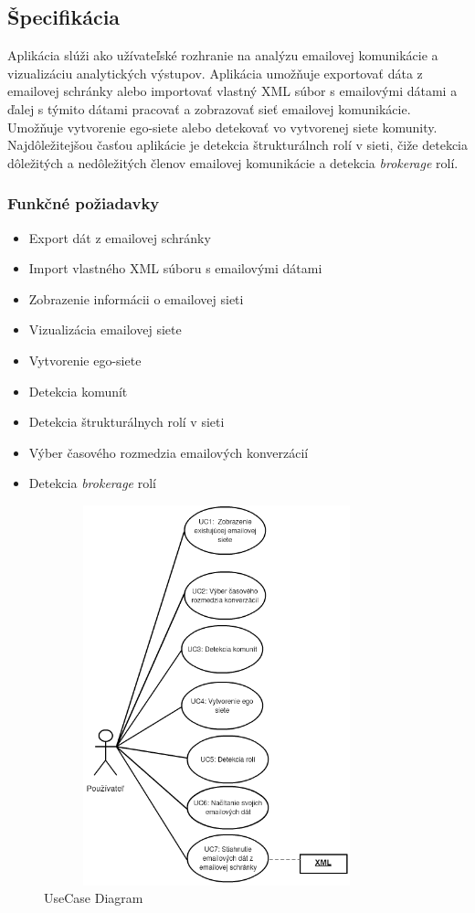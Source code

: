 \documentclass[slovak,master,public,dept460,male,cpdeclaration,oneside]{diploma}
\begin{document}
\subsection{Špecifikácia}
Aplikácia slúži ako užívateľské rozhranie na analýzu emailovej komunikácie a vizualizáciu analytických výstupov. Aplikácia umožňuje exportovať dáta z emailovej schránky alebo importovať vlastný XML súbor s emailovými dátami a ďalej s týmito dátami pracovať a zobrazovať sieť emailovej komunikácie. Umožňuje vytvorenie ego-siete alebo detekovať vo vytvorenej siete komunity. Najdôležitejšou časťou aplikácie je detekcia štrukturálnch rolí v sieti, čiže detekcia dôležitých a nedôležitých členov emailovej komunikácie a detekcia \textit{brokerage} rolí.


\subsubsection{Funkčné požiadavky}
\begin{itemize}
\item Export dát z emailovej schránky
\item Import vlastného XML súboru s emailovými dátami
\item Zobrazenie informácii o emailovej sieti
\item Vizualizácia emailovej siete
\item Vytvorenie ego-siete
\item Detekcia komunít
\item Detekcia štrukturálnych rolí v sieti
\item Výber časového rozmedzia emailových konverzácií
\item Detekcia \textit{brokerage} rolí
\end{itemize}


\begin{figure}[H]
\centering
\includegraphics[width=10cm, height=11cm]{figures/diagram_usecase}
\caption{UseCase Diagram}
\end{figure}
\end{document}
